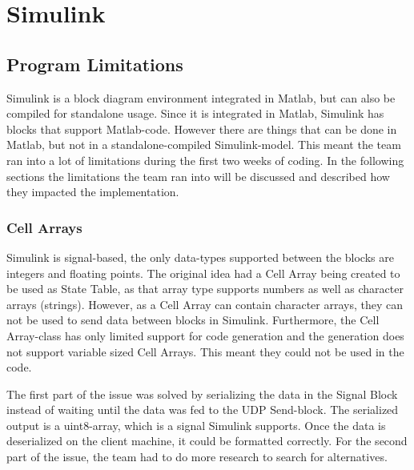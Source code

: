 \section{Simulink}\label{sec:simulink}

\subsection{Program Limitations}\label{sec:simprolim}
Simulink is a block diagram environment integrated in Matlab, but can also be compiled for standalone usage. Since it is integrated in Matlab, Simulink has blocks that support Matlab-code. However there are things that can be done in Matlab, but not in a standalone-compiled Simulink-model. This meant the team ran into a lot of limitations during the first two weeks of coding. In the following sections the limitations the team ran into will be discussed and described how they impacted the implementation.

\subsubsection{Cell Arrays}
Simulink is signal-based, the only data-types supported between the blocks are integers and floating points. The original idea had a Cell Array being created to be used as State Table, as that array type supports numbers as well as character arrays (strings). However, as a Cell Array can contain character arrays, they can not be used to send data between blocks in Simulink. Furthermore, the Cell Array-class has only limited support for code generation and the generation does not support variable sized Cell Arrays. This meant they could not be used in the code.

The first part of the issue was solved by serializing the data in the Signal Block instead of waiting until the data was fed to the UDP Send-block. The serialized output is a uint8-array, which is a signal Simulink supports. Once the data is deserialized on the client machine, it could be formatted correctly. For the second part of the issue, the team had to do more research to search for alternatives.

